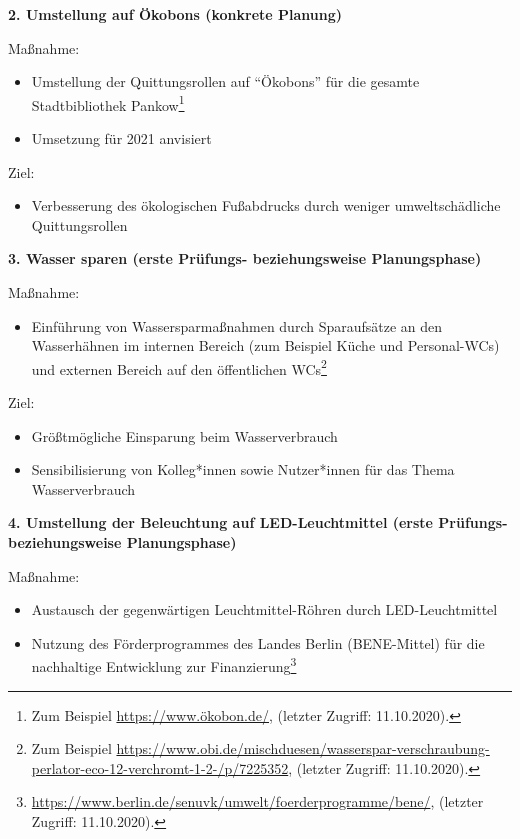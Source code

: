 \documentclass[a4paper,
fontsize=11pt,
oneside,
numbers=noperiodatend,
parskip=half-,
bibliography=totoc,
final
]{scrartcl}
\begin{document}
\textbf{2. Umstellung auf Ökobons (konkrete Planung)}

Maßnahme:

\begin{itemize}[itemsep=-5pt]

\item
  Umstellung der Quittungsrollen auf \enquote{Ökobons} für die gesamte
  Stadtbibliothek Pankow\footnote{Zum Beispiel
    \href{about:blank}{https://www.ökobon.de/}, (letzter Zugriff:
    11.10.2020).}
\item
  Umsetzung für 2021 anvisiert
\end{itemize}

Ziel:

\begin{itemize}[itemsep=-5pt]

\item
  Verbesserung des ökologischen Fußabdrucks durch weniger
  umweltschädliche Quittungsrollen
\end{itemize}

\textbf{3. Wasser sparen (erste Prüfungs- beziehungsweise
Planungsphase)}

Maßnahme:

\begin{itemize}[itemsep=-5pt]

\item
  Einführung von Wassersparmaßnahmen durch Sparaufsätze an den
  Wasserhähnen im internen Bereich (zum Beispiel Küche und Personal-WCs)
  und externen Bereich auf den öffentlichen WCs\footnote{Zum Beispiel
    \url{https://www.obi.de/mischduesen/wasserspar-verschraubung-perlator-eco-12-verchromt-1-2-/p/7225352},
    (letzter Zugriff: 11.10.2020).}
\end{itemize}

Ziel:

\begin{itemize}[itemsep=-5pt]

\item
  Größtmögliche Einsparung beim Wasserverbrauch
\item
  Sensibilisierung von Kolleg*innen sowie Nutzer*innen für das Thema
  Wasserverbrauch
\end{itemize}

\textbf{4. Umstellung der Beleuchtung auf LED-Leuchtmittel (erste
Prüfungs- beziehungsweise Planungsphase)}

Maßnahme:

\begin{itemize}[itemsep=-5pt]

\item
  Austausch der gegenwärtigen Leuchtmittel-Röhren durch LED-Leuchtmittel
\item
  Nutzung des Förderprogrammes des Landes Berlin (BENE-Mittel) für die
  nachhaltige Entwicklung zur Finanzierung\footnote{\url{https://www.berlin.de/senuvk/umwelt/foerderprogramme/bene/},
    (letzter Zugriff: 11.10.2020).}
\end{itemize}
\end{document}
